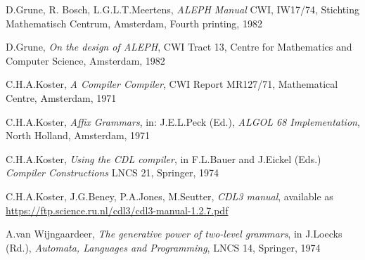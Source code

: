 \documentclass{article}
\begin{document}
\begin{thebibliography}{99}
D.Grune, R. Bosch, L.G.L.T.Meertens,
\emph{ALEPH Manual}
CWI, IW17/74, Stichting Mathematisch Centrum, Amsterdam, 
Fourth printing, 1982

D.Grune,
\emph{On the design of ALEPH},
CWI Tract 13, Centre for Mathematics and Computer Science, Amsterdam, 1982

C.H.A.Koster,
\emph{A Compiler Compiler},
CWI Report MR127/71,
Mathematical Centre, Amsterdam, 1971

C.H.A.Koster,
\emph{Affix Grammars}, in:
J.E.L.Peck (Ed.), \emph{ALGOL 68 Implementation}, North Holland, Amsterdam,
1971

C.H.A.Koster,
\emph{Using the CDL compiler}, in
F.L.Bauer and J.Eickel (Eds.) \emph{Compiler Constructions}
LNCS 21, Springer, 1974

C.H.A.Koster, J.G.Beney, P.A.Jones, M.Seutter,
\emph{CDL3 manual},
available as \url{https://ftp.science.ru.nl/cdl3/cdl3-manual-1.2.7.pdf}

A.van Wijngaardeer,
\emph{The generative power of two-level grammars}, in
J.Loecks (Rd.), \emph{Automata, Languages and Programming},
LNCS 14, Springer, 1974


\end{thebibliography}
\end{document}
